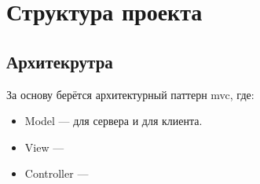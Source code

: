 \section{Структура проекта}

\subsection{Архитекрутра}
За основу берётся архитектурный паттерн \acrshort{mvc}, где:
\begin{itemize}
    \item Model --- \textcite{} для сервера и \textcite{redux} для клиента.
    \item View --- \textcite{react}
    \item Controller --- 
\end{itemize}

\clearpage